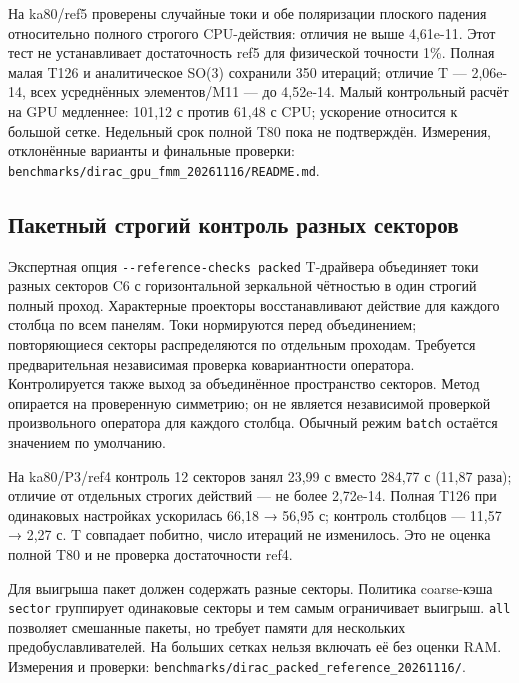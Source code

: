 \documentclass[
  russian,
  11pt,
  a4paper,
]{report}
\begin{document}
На ka80/ref5 проверены случайные токи и обе поляризации плоского падения
относительно полного строгого CPU-действия: отличия не выше 4,61e-11.
Этот тест не устанавливает достаточность ref5 для физической точности
1\%. Полная малая T126 и аналитическое SO(3) сохранили 350 итераций;
отличие T --- 2,06e-14, всех усреднённых элементов/M11 --- до 4,52e-14.
Малый контрольный расчёт на GPU медленнее: 101,12 с против 61,48 с CPU;
ускорение относится к большой сетке. Недельный срок полной T80 пока не
подтверждён. Измерения, отклонённые варианты и финальные проверки:
\nolinkurl{benchmarks/dirac_gpu_fmm_20261116/README.md}.

\subsection{Пакетный строгий контроль разных
секторов}\label{ux43fux430ux43aux435ux442ux43dux44bux439-ux441ux442ux440ux43eux433ux438ux439-ux43aux43eux43dux442ux440ux43eux43bux44c-ux440ux430ux437ux43dux44bux445-ux441ux435ux43aux442ux43eux440ux43eux432}

Экспертная опция \nolinkurl{--reference-checks packed} T-драйвера
объединяет токи разных секторов C6 с горизонтальной зеркальной чётностью
в один строгий полный проход. Характерные проекторы восстанавливают
действие для каждого столбца по всем панелям. Токи нормируются перед
объединением; повторяющиеся секторы распределяются по отдельным
проходам. Требуется предварительная независимая проверка ковариантности
оператора. Контролируется также выход за объединённое пространство
секторов. Метод опирается на проверенную симметрию; он не является
независимой проверкой произвольного оператора для каждого столбца.
Обычный режим \nolinkurl{batch} остаётся значением по умолчанию.

На ka80/P3/ref4 контроль 12 секторов занял 23,99 с вместо 284,77 с
(11,87 раза); отличие от отдельных строгих действий --- не более
2,72e-14. Полная T126 при одинаковых настройках ускорилась 66,18 → 56,95
с; контроль столбцов --- 11,57 → 2,27 с. T совпадает побитно, число
итераций не изменилось. Это не оценка полной T80 и не проверка
достаточности ref4.

Для выигрыша пакет должен содержать разные секторы. Политика coarse-кэша
\nolinkurl{sector} группирует одинаковые секторы и тем самым
ограничивает выигрыш. \nolinkurl{all} позволяет смешанные пакеты, но
требует памяти для нескольких предобуславливателей. На больших сетках
нельзя включать её без оценки RAM. Измерения и проверки:
\nolinkurl{benchmarks/dirac_packed_reference_20261116/}.
\end{document}
